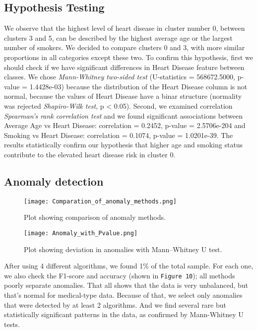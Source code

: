 \documentclass[12pt, a4paper]{article}
\begin{document}
\subsection{Hypothesis Testing}
\hspace*{1em}
We observe that the highest level of heart disease in cluster number 0, between clusters 3 and 5, can be described by the highest average age or the largest number of smokers. We decided to compare clusters 0 and 3, with more similar proportions in all categories except these two. To confirm this hypothesis, first we should check if we have significant differences in Heart Disease feature between classes. We chose \textit{Mann-Whitney two-sided test} (U-statistics = 568672.5000, p-value = 1.4428e-03)  because the distribution of the Heart Disease column is not normal, because the values of Heart Disease have a binar structure (normality was rejected \textit{Shapiro-Wilk test}, p < 0.05). Second, we examined correlation \textit{Spearman's rank correlation test} and we found significant associations between Average Age vs Heart Disease: correlation = 0.2452, p-value = 2.5706e-204 and Smoking vs Heart Disease: correlation = 0.1074, p-value = 1.0201e-39. The results statistically confirm our hypothesis that higher age and smoking status contribute to the elevated heart disease risk in cluster 0. 

\subsection{Anomaly detection}
\hspace*{1em}
\begin{figure}[htbp]
  \centering
	\begin{minipage}{0.48\textwidth}
	  \centering
	  \texttt{[image: Comparation\_of\_anomaly\_methods.png]}
    \caption{Plot showing comparison of anomaly methods.}
    \label{fig:scree_BestAnomaly}
  \end{minipage}
  \hfill
  \begin{minipage}{0.48\textwidth}
    \centering
	  \texttt{[image: Anomaly\_with\_Pvalue.png]}
    \caption{Plot showing deviation in anomalies with Mann–Whitney U test.}
    \label{fig:scree_PvalueAnomaly}
  \end{minipage}
\end{figure}

After using 4 different algorithms, we found 1\% of the total sample. For each one, we also check the F1-score and accuracy (shown in \texttt{Figure 10}); all methods poorly separate anomalies. That all shows that the data is very unbalanced, but that's normal for medical-type data. Because of that, we select only anomalies that were detected by at least 2 algorithms. And we find several rare but statistically significant patterns in the data, as confirmed by Mann-Whitney U tests.
\end{document}
